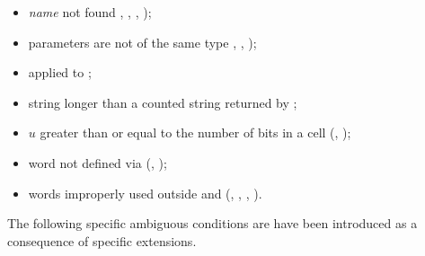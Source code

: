 \begin{itemize}
\item \emph{name} not found ,
	, ,
	);

\item parameters are not of the same type ,
	, );

\item {}
	applied to ;

\item string longer than a counted string returned by
	;

\item $u$ greater than or equal to the number of bits in a cell
	(, );

\item word not defined via 
	(, );

\item words improperly used outside
	 and 
	(, ,
	 , ).
\end{itemize}

The following specific ambiguous conditions are have been introduced
as a consequence of specific extensions.

